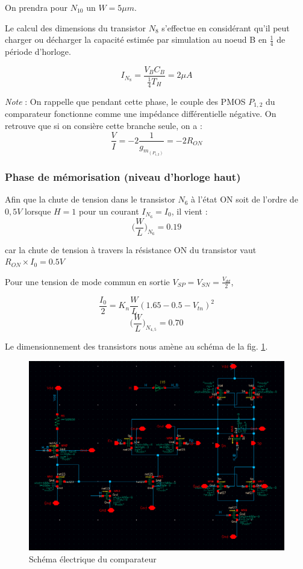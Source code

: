 \documentclass[11pt]{article}
\begin{document}
On prendra pour $N_{10}$ un $W = 5 \mu m$.

Le calcul des dimensions du transistor $N_8$ s'effectue en consid\'erant qu'il peut charger ou d\'echarger
la capacit\'e estim\'ee par simulation au noeud B en $\frac{1}{4}$ de p\'eriode d'horloge.

\[
I_{N_8} = \frac {V_B C_B}{\frac{1}{4} T_H} = 2 \mu A
\]

\textit{Note} : On rappelle que pendant cette phase, le couple des PMOS $P_{1,2}$ du comparateur fonctionne comme une imp\'edance diff\'erentielle n\'egative\cite{Razavi-Data-Conversion}. On retrouve que si on consi\`ere cette branche seule, on a :
\[
\frac{V}{I}= -2 \frac{1}{g_m_{(P_{1,2})}} = -2 R_{ON}
\]


\subsubsection{Phase de m\'emorisation (niveau d'horloge haut)}

Afin que la chute de tension dans le transistor $N_6$  \`a l'\'etat ON soit de l'ordre de $0,5 V$ lorsque $H=1$
pour un courant $I_{N_6}= I_0$, il vient :
\[
  \bigg(\frac{W}{L} \bigg)_{N_6} = 0.19
\]

car la chute de tension \`a travers la r\'esistance ON du transistor vaut $R_{ON} \times I_0 = 0.5V$

Pour une tension de mode commun en sortie $V_{SP}=V_{SN} = \frac{V_{dd}}{2}$,

\[
  \frac{I_0}{2} = K_n \frac{W}{L}(1.65-0.5 - V_{tn})^2
\]
\[
  \bigg(\frac{W}{L} \bigg)_{N_{4,5}} = 0.70
\]

Le dimensionnement des transistors nous am\`ene au sch\'ema de la fig. \ref{fig:schcomp}.


\clearpage

\begin{figure}[!htb]
      \centering
      \includegraphics[width=0.8\linewidth]{comparateur_schema_cadence_.png}
      \caption{Sch\'ema \'electrique du comparateur}
      \label{fig:schcomp}
\end{figure}%
\end{document}
